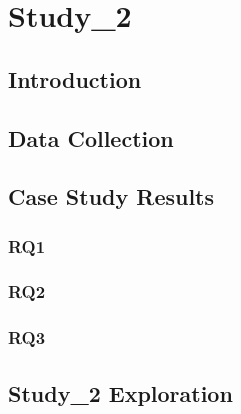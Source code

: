 \chapter{Study_2}\label{Ch:S2}




\section{Introduction}
\label{sec:Study2_intro}


\section{Data Collection}
\label{sec:Study2_Methodology}


\section{Case Study Results}
\label{sec:Study2_Results}

\subsection{RQ1}
\label{sec:Study2_RQ1_Results}


\subsection{RQ2}


\subsection{RQ3}
\label{sec:Study2_RQ3_Results}


\section{Study_2 Exploration}
\label{sec:Study2_quality_attribute_refernece_architecture}


